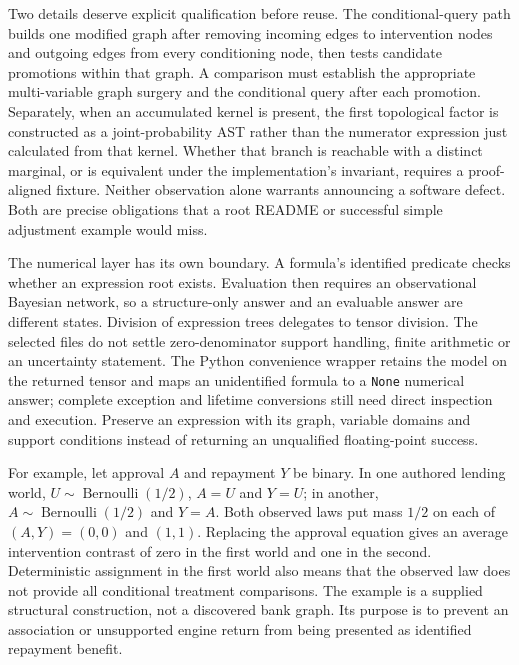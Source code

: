 Two details deserve explicit qualification before reuse. The conditional-query
path builds one modified graph after removing incoming edges to intervention
nodes and outgoing edges from every conditioning node, then tests candidate
promotions within that graph. A comparison must establish the appropriate
multi-variable graph surgery and the conditional query after each promotion.
Separately, when an accumulated kernel is present, the first topological
factor is constructed as a joint-probability AST rather than the numerator
expression just calculated from that kernel. Whether that branch is reachable
with a distinct marginal, or is equivalent under the implementation's invariant,
requires a proof-aligned fixture. Neither observation alone warrants announcing
a software defect. Both are precise obligations that a root README or successful
simple adjustment example would miss.
\citep{exec19_cxx_identification_source}

The numerical layer has its own boundary. A formula's identified predicate
checks whether an expression root exists. Evaluation then requires an
observational Bayesian network, so a structure-only answer and an evaluable
answer are different states. Division of expression trees delegates to tensor
division. The selected files do not settle zero-denominator support handling,
finite arithmetic or an uncertainty statement. The Python convenience wrapper
retains the model on the returned tensor and maps an unidentified formula to a
\texttt{None} numerical answer; complete exception and lifetime conversions
still need direct inspection and execution. Preserve an expression with its
graph, variable domains and support conditions instead of returning an
unqualified floating-point success.
\citep{exec19_cxx_identification_source}

For example, let approval $A$ and repayment $Y$ be binary. In one authored
lending world, $U\sim\operatorname{Bernoulli}(1/2)$, $A=U$ and $Y=U$;
in another, $A\sim\operatorname{Bernoulli}(1/2)$ and $Y=A$. Both observed laws
put mass $1/2$ on each of $(A,Y)=(0,0)$ and $(1,1)$. Replacing the approval
equation gives an average intervention contrast of zero in the first world
and one in the second. Deterministic assignment in the first world also means
that the observed law does not provide all conditional treatment comparisons.
The example is a supplied structural construction, not a discovered bank graph.
Its purpose is to prevent an association or unsupported engine return from
being presented as identified repayment benefit.
\citep{exec19_cxx_identification_reference}

